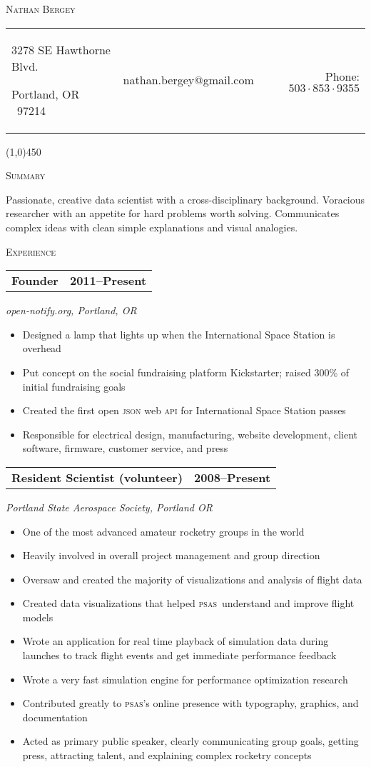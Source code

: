 \documentclass[letterpaper,10pt]{article}
\makeatletter
\newcommand{\me}      {Nathan Bergey}
\newcommand{\email}   {nathan.bergey@gmail.com}
\newcommand{\address} {\begin{minipage}{2in}\raggedright3278 SE Hawthorne Blvd.\par Portland, OR \ 97214\end{minipage}}
\newcommand{\phone}   {$503\cdot853\cdot9355$}
\newcommand{\PSAS}{\textsc{psas}}
\newcommand{\resumepageheader}{
  \begin{center}
    {\LARGE{\textsc{\me}}}

    \vspace{0.2in}

    \begin{tabular*}{6.5in}{l c@{\extracolsep{\fill}} r}
      \address & \email & Phone: \phone \\
    \end{tabular*}
    
    \vspace{0.02in}

    \line(1,0){450}
  \end{center}
}
\newcommand{\resumestatement}[1]{
  \vspace{0.05in}
  \textsc{\Large Summary}
  \vspace{0.1in}
  \begin{center}
    \begin{minipage}{5.5in}
      \small
      #1
    \end{minipage}
  \end{center}
  \vspace{0.078in}
}
\newcommand{\resumeheader}[1]{
  \vspace{0.05in}
  \textsc{\Large #1}
  \vspace{0.10in}
}
\newcommand{\resumeitem}[4]{
  {\addtolength{\leftskip}{0.21in}
    \begin{tabular*}{6.25in}{l@{\extracolsep{\fill}} r}
      {\textbf{#1}} & {\textbf{#2}} \\
    \end{tabular*}
    
  }
  
  \vspace{0.01in}
  {\addtolength{\leftskip}{0.3in}
    \textit{#3}
  
  }
  
  \vspace{0.09in}
  {\addtolength{\leftskip}{0.3in}
    \small
    \begin{minipage}{5in}
      #4
    \end{minipage}
    
  }
  
  \vspace{0.15in}
}
\makeatother
\begin{document}
\resumepageheader

\resumestatement{
                  Passionate, creative data scientist with a cross-disciplinary 
                  background. Voracious researcher with an appetite for hard problems 
                  worth solving. Communicates complex ideas with clean simple explanations
                  and visual analogies.
                }


\resumeheader{Experience} 

\resumeitem{Founder}{2011--Present}%
           {open-notify.org, Portland, OR}%
           {
              \begin{itemize}[topsep=1pt, itemsep=0pt, parsep=0pt]
                \renewcommand{\labelitemi}{---}
                \item Designed a lamp that lights up when the International Space Station is overhead
                \item Put concept on the social fundraising platform Kickstarter; raised 300\% of initial fundraising goals
                \item Created the first open \textsc{json} web \textsc{api} for International Space Station passes
                \item Responsible for electrical design, manufacturing, website development, client software, firmware, customer service, and press
              \end{itemize}
           }

\resumeitem{Resident Scientist (volunteer)}{2008--Present}%
           {Portland State Aerospace Society, Portland OR}%
           {
              \begin{itemize}[topsep=1pt, itemsep=0pt, parsep=0pt]
                \renewcommand{\labelitemi}{---}
                \item One of the most advanced amateur rocketry groups in the world
                \item Heavily involved in overall project management and group direction
                \item Oversaw and created the majority of visualizations and analysis of flight data
                \item Created data visualizations that helped \PSAS\ understand and improve flight models
                \item Wrote an application for real time playback of simulation data during launches to track flight events and get immediate performance feedback
                \item Wrote a very fast simulation engine for performance optimization research
                \item Contributed greatly to \PSAS's online presence with typography, graphics, and documentation
                \item Acted as primary public speaker, clearly communicating group goals, getting press, attracting talent, and explaining complex rocketry concepts
              \end{itemize}
           }
           
\end{document}
